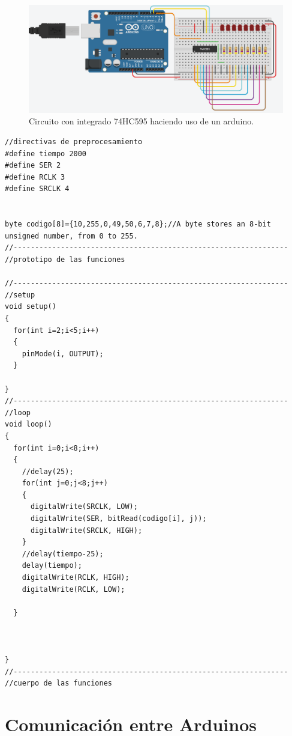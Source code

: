 \documentclass{article}
\begin{document}
\begin{itemize}
\begin{figure}[h]
\includegraphics[scale=0.4]{prueba arduino integrado.png}
\centering
\caption{Circuito con integrado 74HC595 haciendo uso de un arduino.}
\label{fig:reemplazo pulsador por arduino}
\end{figure}

\newpage
\begin{lstlisting}[style=myArduino]
//directivas de preprocesamiento
#define tiempo 2000
#define SER 2
#define RCLK 3
#define SRCLK 4


byte codigo[8]={10,255,0,49,50,6,7,8};//A byte stores an 8-bit unsigned number, from 0 to 255.
//----------------------------------------------------------------
//prototipo de las funciones

//----------------------------------------------------------------
//setup
void setup()
{
  for(int i=2;i<5;i++)
  {
    pinMode(i, OUTPUT);
  }
  
}
//----------------------------------------------------------------
//loop
void loop()
{
  for(int i=0;i<8;i++)
  {
  	//delay(25);
    for(int j=0;j<8;j++)
    {
      digitalWrite(SRCLK, LOW);
      digitalWrite(SER, bitRead(codigo[i], j));
      digitalWrite(SRCLK, HIGH);
    }
    //delay(tiempo-25);
    delay(tiempo);
    digitalWrite(RCLK, HIGH);
    digitalWrite(RCLK, LOW);
    
  }
  
  
  
}
//----------------------------------------------------------------
//cuerpo de las funciones
\end{lstlisting}


\end{itemize}


\vspace{0.5cm}
\noindent


\section{Comunicación entre Arduinos} \label{Comunicación entre Arduinos}
\end{document}
